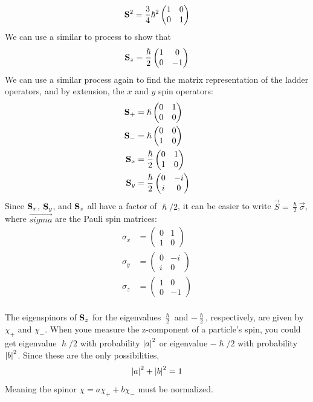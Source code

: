 \documentclass[a4paper]{article}
\begin{document}
\[ \mathbf{S}^2 = \frac34\hslash^2\begin{pmatrix}1&0\\0&1\end{pmatrix} \]
We can use a similar to process to show that
\[ \mathbf{S}_z = \frac{\hslash}{2}\begin{pmatrix}1&0\\0&-1\end{pmatrix} \]
We can use a similar process again to find the matrix representation of the
ladder operators, and by extension, the $x$ and $y$ spin operators:
\begin{align*}
	\mathbf{S}_+ &= \hslash\begin{pmatrix}0&1\\0&0\end{pmatrix}\\
	\mathbf{S}_- &= \hslash\begin{pmatrix}0&0\\1&0\end{pmatrix}\\
	\mathbf{S}_x &= \frac{\hslash}{2}\begin{pmatrix}0&1\\1&0\end{pmatrix}\\
	\mathbf{S}_y &= \frac{\hslash}{2}\begin{pmatrix}0&-i\\i&0\end{pmatrix}\\
\end{align*}
Since $\mathbf{S}_x$, $\mathbf{S}_y$, and $\mathbf{S}_z$ all have a factor of
$\hslash/2$, it can be easier to write
$\vec{S} = \frac{\hslash}{2}\vec{\sigma}$, where $\vec{sigma}$ are the Pauli
spin matrices:
\begin{align*}
	\sigma_x &= \begin{pmatrix}0&1\\1&0\end{pmatrix}\\
	\sigma_y &= \begin{pmatrix}0&-i\\i&0\end{pmatrix}\\
	\sigma_z &= \begin{pmatrix}1&0\\0&-1\end{pmatrix}\\
\end{align*}

The eigenspinors of $\mathbf{S}_z$ for the eigenvalues $\frac{\hslash}{2}$ and
$-\frac{\hslash}{2}$, respectively, are given by $\chi_+$ and $\chi_-$. When
youe measure the z-component of a particle's spin, you could get
eigenvalue $\hslash/2$ with probability $\left\lvert a\right\rvert^2$ or eigenvalue
$-\hslash/2$ with probability $\left\lvert b\right\rvert^2$. Since these are the only
possibilities, \[ \left\lvert a\right\rvert^2+\left\lvert b\right\rvert^2=1 \] Meaning the spinor
$\chi = a\chi_++b\chi_-$ must be normalized.
\end{document}
